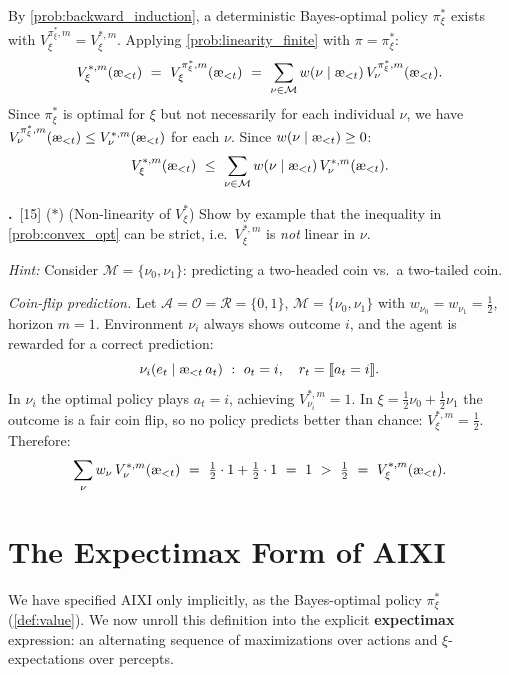 \documentclass[fontsize=11pt, parskip=half]{scrartcl}
\theoremstyle{definition}
\newenvironment{solution}{%
    \begin{tcolorbox}[colback=black!5!white, colframe=black!50!white,
      title={\textbf{Solution}}, fonttitle=\normalfont, breakable]
  }{\end{tcolorbox}}
\newenvironment{solution}{\expandafter\comment}{\expandafter\endcomment}
\newcommand{\mysubsection}[2]{\par\medskip\noindent\refstepcounter{subsection}\textbf{\thesubsection.}~#2\par\smallskip}
\newcommand{\cA}{\mathcal{A}}
\newcommand{\cO}{\mathcal{O}}
\newcommand{\cR}{\mathcal{R}}
\newcommand{\cM}{\mathcal{M}}
\newcommand{\aes}{\textnormal{\ae}}
\begin{document}
\begin{solution}
By \cref{prob:backward_induction}, a deterministic Bayes-optimal policy $\pi_\xi^*$ exists with $V_\xi^{\pi_\xi^*,m} = V_\xi^{*,m}$.
Applying \cref{prob:linearity_finite} with $\pi = \pi_\xi^*$:
\[
    V_\xi^{*,m}(\aes_{<t})
    ~=~ V_\xi^{\pi_\xi^*,m}(\aes_{<t})
    ~=~ \sum_{\nu \in \cM} w(\nu \mid \aes_{<t})\, V_\nu^{\pi_\xi^*,m}(\aes_{<t}).
\]
Since $\pi_\xi^*$ is optimal for $\xi$ but not necessarily for each individual $\nu$, we have $V_\nu^{\pi_\xi^*,m}(\aes_{<t}) \leq V_\nu^{*,m}(\aes_{<t})$ for each $\nu$.
Since $w(\nu \mid \aes_{<t}) \geq 0$:
\[
    V_\xi^{*,m}(\aes_{<t}) ~\leq~ \sum_{\nu \in \cM} w(\nu \mid \aes_{<t})\, V_\nu^{*,m}(\aes_{<t}).
\]
\end{solution}

\mysubsection{4}{[15] ($\ast$) (Non-linearity of $V_\xi^*$)\label{prob:nonlinear_opt}
Show by example that the inequality in \cref{prob:convex_opt} can be strict, i.e.\ $V_\xi^{*,m}$ is \emph{not} linear in $\nu$.}

\textit{Hint:} Consider $\cM = \{\nu_0, \nu_1\}$: predicting a two-headed coin vs.\ a two-tailed coin.

\begin{solution}
\emph{Coin-flip prediction.}
Let $\cA = \cO = \cR = \{0,1\}$, $\cM = \{\nu_0, \nu_1\}$ with $w_{\nu_0} = w_{\nu_1} = \tfrac{1}{2}$, horizon $m = 1$.
Environment $\nu_i$ always shows outcome $i$, and the agent is rewarded for a correct prediction:
\[
    \nu_i(e_t \mid \aes_{<t}\, a_t) ~:~ o_t = i, \quad r_t = \llbracket a_t = i \rrbracket.
\]
In $\nu_i$ the optimal policy plays $a_t = i$, achieving $V_{\nu_i}^{*,m} = 1$.
In $\xi = \tfrac{1}{2}\nu_0 + \tfrac{1}{2}\nu_1$ the outcome is a fair coin flip, so no policy predicts better than chance: $V_\xi^{*,m} = \tfrac{1}{2}$.
Therefore:
\[
    \sum_\nu w_\nu\, V_\nu^{*,m}(\aes_{<t}) ~=~ \tfrac{1}{2} \cdot 1 + \tfrac{1}{2} \cdot 1 ~=~ 1 ~>~ \tfrac{1}{2} ~=~ V_\xi^{*,m}(\aes_{<t}).
\]
\end{solution}

\section{The Expectimax Form of AIXI}\label{prob:expectimax}

We have specified AIXI only implicitly, as the Bayes-optimal policy $\pi_\xi^*$ (\cref{def:value}).
We now unroll this definition into the explicit \textbf{expectimax} expression: an alternating sequence of maximizations over actions and $\xi$-expectations over percepts.
\end{document}
